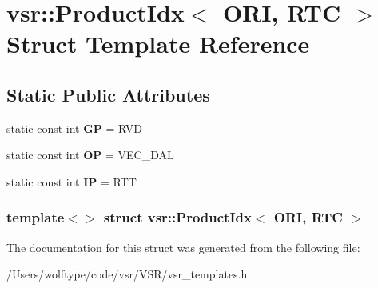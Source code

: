 \hypertarget{structvsr_1_1_product_idx_3_01_o_r_i_00_01_r_t_c_01_4}{\section{vsr\-:\-:Product\-Idx$<$ O\-R\-I, R\-T\-C $>$ Struct Template Reference}
\label{structvsr_1_1_product_idx_3_01_o_r_i_00_01_r_t_c_01_4}
}
\subsection*{Static Public Attributes}
\begin{DoxyCompactItemize}
\item 
\hypertarget{structvsr_1_1_product_idx_3_01_o_r_i_00_01_r_t_c_01_4_ae3886d2530b3c35752eaef1c98c22d09}{static const int {\bfseries G\-P} = R\-V\-D}\label{structvsr_1_1_product_idx_3_01_o_r_i_00_01_r_t_c_01_4_ae3886d2530b3c35752eaef1c98c22d09}

\item 
\hypertarget{structvsr_1_1_product_idx_3_01_o_r_i_00_01_r_t_c_01_4_a73b7d20eef686b42465d6e0609b595cd}{static const int {\bfseries O\-P} = V\-E\-C\-\_\-\-D\-A\-L}\label{structvsr_1_1_product_idx_3_01_o_r_i_00_01_r_t_c_01_4_a73b7d20eef686b42465d6e0609b595cd}

\item 
\hypertarget{structvsr_1_1_product_idx_3_01_o_r_i_00_01_r_t_c_01_4_a60c7b803472d3e022b46837a5b755dad}{static const int {\bfseries I\-P} = R\-T\-T}\label{structvsr_1_1_product_idx_3_01_o_r_i_00_01_r_t_c_01_4_a60c7b803472d3e022b46837a5b755dad}

\end{DoxyCompactItemize}
\subsubsection*{template$<$$>$ struct vsr\-::\-Product\-Idx$<$ O\-R\-I, R\-T\-C $>$}



The documentation for this struct was generated from the following file\-:\begin{DoxyCompactItemize}
\item 
/\-Users/wolftype/code/vsr/\-V\-S\-R/vsr\-\_\-templates.\-h\end{DoxyCompactItemize}
